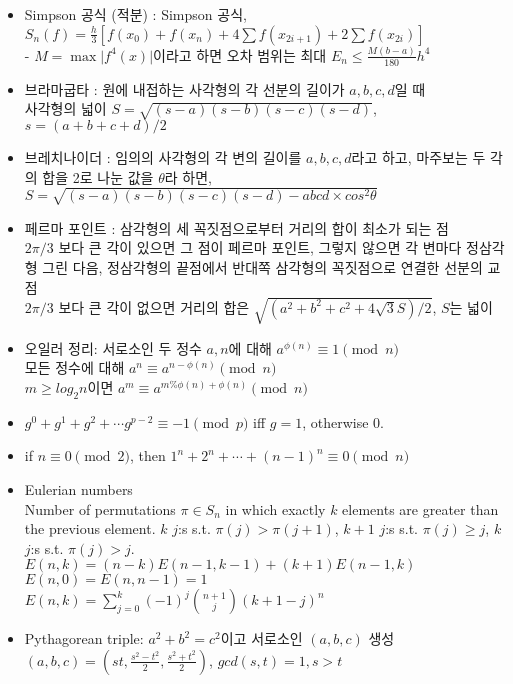 \documentclass[8pt, a4paper, oneside, landscape]{extarticle}
\begin{document}
\begin{multicols*}{2}
\begin{itemize}[noitemsep]
    \item Simpson 공식 (적분) : Simpson 공식, $S_n(f) = \frac{h}{3}[f(x_0)+f(x_n)+ 4\sum f(x_{2i+1}) + 2\sum f(x_{2i})]$\\
    - $M = \max \vert f^4(x) \vert$이라고 하면 오차 범위는 최대 $E_n \leq \frac{M(b-a)}{180}h^4$
    
    \item 브라마굽타 : 원에 내접하는 사각형의 각 선분의 길이가 $a, b, c, d$일 때\\
    사각형의 넓이 $S=\sqrt{(s-a)(s-b)(s-c)(s-d)}$, $s=(a+b+c+d)/2$
    
    \item 브레치나이더 : 임의의 사각형의 각 변의 길이를 $a,b,c,d$라고 하고, 마주보는 두 각의 합을 2로 나눈 값을 $\theta$라 하면, $S=\sqrt{(s-a)(s-b)(s-c)(s-d)-abcd\times cos^2 \theta}$
    
    \item 페르마 포인트 : 삼각형의 세 꼭짓점으로부터 거리의 합이 최소가 되는 점\\
    $2\pi/3$ 보다 큰 각이 있으면 그 점이 페르마 포인트, 그렇지 않으면 각 변마다 정삼각형 그린 다음, 정삼각형의 끝점에서 반대쪽 삼각형의 꼭짓점으로 연결한 선분의 교점\\
    $2\pi/3$ 보다 큰 각이 없으면 거리의 합은 $\sqrt{(a^2 + b^2 + c^2 + 4\sqrt 3 S) / 2}$, $S$는 넓이
    
    \item 오일러 정리: 서로소인 두 정수 $a,n$에 대해 $a^{\phi(n)}\equiv 1 \pmod n$\\
    모든 정수에 대해 $a^n \equiv a^{n-\phi(n)} \pmod n$\\
    $m\geq log_2 n$이면 $a^m\equiv a^{m\%\phi(n)+\phi(n)}\pmod n$
    
    \item $g^0+g^1+g^2+\cdots g^{p-2}\equiv -1 \pmod p$ iff $g=1$, otherwise $0$.
    
    \item if $n \equiv 0 \pmod 2$, then $1^n + 2^n + \cdots + (n-1)^n \equiv 0 \pmod n$
    
    \item Eulerian numbers\\
    Number of permutations $\pi \in S_n$ in which exactly $k$ elements are greater than the previous element. $k$ $j$:s s.t. $\pi(j)>\pi(j+1)$, $k+1$ $j$:s s.t. $\pi(j)\geq j$, $k$ $j$:s s.t. $\pi(j)>j$.\\
    $E(n,k) = (n-k)E(n-1,k-1) + (k+1)E(n-1,k)$\\
    $E(n,0) = E(n,n-1) = 1$\\
    $E(n,k) = \sum_{j=0}^k(-1)^j\binom{n+1}{j}(k+1-j)^n$
    
    \item Pythagorean triple: $a^2+b^2=c^2$이고 서로소인 $(a,b,c)$ 생성\\
    $(a, b, c) = (st, \frac{s^2-t^2}{2}, \frac{s^2+t^2}{2})$, $gcd(s,t)=1, s>t$
    
\end{itemize}

\end{multicols*}
\end{document}
